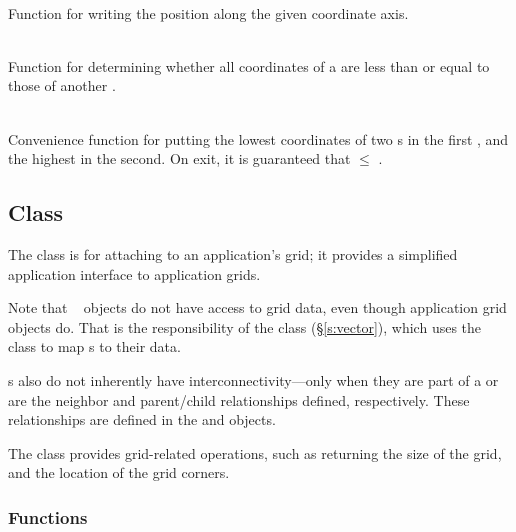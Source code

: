 \documentclass[11pt]{article}
\begin{document}
     \\ Function for
    writing the  position along the given coordinate
    axis.

     \\
    Function for determining whether all coordinates of a 
    are less than or equal to those of another .

     \\
    Convenience function for putting the lowest coordinates of two
    s in the first , and the highest in the
    second.  On exit, it is guaranteed that  $\le$ .

\subsection{ Class} \label{s:grid}

   \umlGrid

   The  class is for attaching to an application's grid;
   it provides a simplified application interface to application
   grids.

   Note that \amrSolve\  objects do not have access to
   grid data, even though application grid objects do.  That is the
   responsibility of the  class (\S\ref{s:vector}), which
   uses the  class to map s to their data.

   s also do not inherently have interconnectivity---only
   when they are part of a  or  are
   the neighbor and parent/child relationships defined, respectively.
   These relationships are defined in the  and 
   objects.

   The  class provides grid-related operations, such as returning
   the size of the grid, and the location of the grid corners.


\subsubsection{ Functions}
\end{document}

